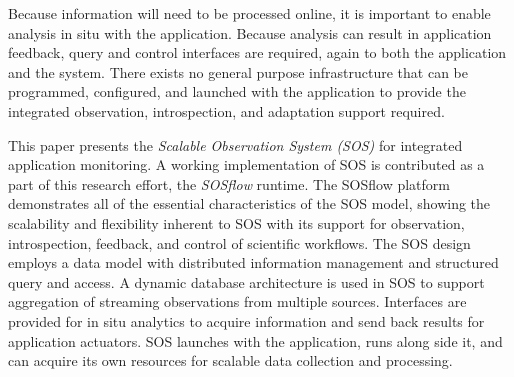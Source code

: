 %
Because information will need to be processed online, it is important
to enable analysis in situ with the application.
%
%
Because analysis can result in application feedback, query and control
interfaces are required, again to both the application and the system.
%
%
There exists no general purpose infrastructure that can be programmed,
configured, and launched with the application to provide the
integrated observation, introspection, and adaptation support
required.
%
\par
%
This paper presents the \textit{Scalable Observation System (SOS)} for
integrated application monitoring.
%
A working implementation of SOS is contributed as a part of this
research effort, the \textit{SOSflow} runtime.
%
The SOSflow platform demonstrates all of the essential characteristics
of the SOS model, showing the scalability and flexibility inherent to
SOS with its support for observation, introspection, feedback, and
control of scientific workflows.
%
The SOS design employs a data model with distributed
information management and structured query and access.
%
A dynamic database architecture is used in SOS to support aggregation
of streaming observations from multiple sources.
%
%
Interfaces are provided for in situ analytics to acquire
information and send back results for application actuators.
%
SOS launches with the application, runs along side it, and can acquire
its own resources for scalable data collection and processing.
%


